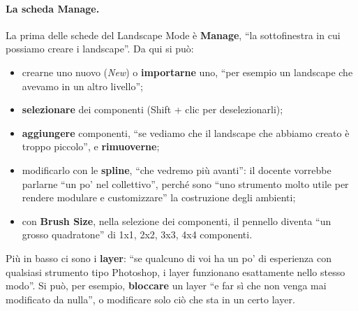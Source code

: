 \paragraph{La scheda Manage.} La prima delle schede del Landscape Mode è \textbf{Manage},
``la sottofinestra in cui possiamo creare i landscape''. Da qui si può:
\begin{itemize}
  \item crearne uno nuovo (\emph{New}) o \textbf{importarne} uno, ``per esempio un
        landscape che avevamo in un altro livello'';
  \item \textbf{selezionare} dei componenti (Shift + clic per deselezionarli);
  \item \textbf{aggiungere} componenti, ``se vediamo che il landscape che abbiamo creato è
        troppo piccolo'', e \textbf{rimuoverne};
  \item modificarlo con le \textbf{spline}, ``che vedremo più avanti'': il docente vorrebbe
        parlarne ``un po' nel collettivo'', perché sono ``uno strumento molto utile per
        rendere modulare e customizzare'' la costruzione degli ambienti;
  \item con \textbf{Brush Size}, nella selezione dei componenti, il pennello diventa ``un
        grosso quadratone'' di 1x1, 2x2, 3x3, 4x4 componenti.
\end{itemize}
Più in basso ci sono i \textbf{layer}: ``se qualcuno di voi ha un po' di esperienza con
qualsiasi strumento tipo Photoshop, i layer funzionano esattamente nello stesso modo''. Si
può, per esempio, \textbf{bloccare} un layer ``e far sì che non venga mai modificato da
nulla'', o modificare solo ciò che sta in un certo layer.

